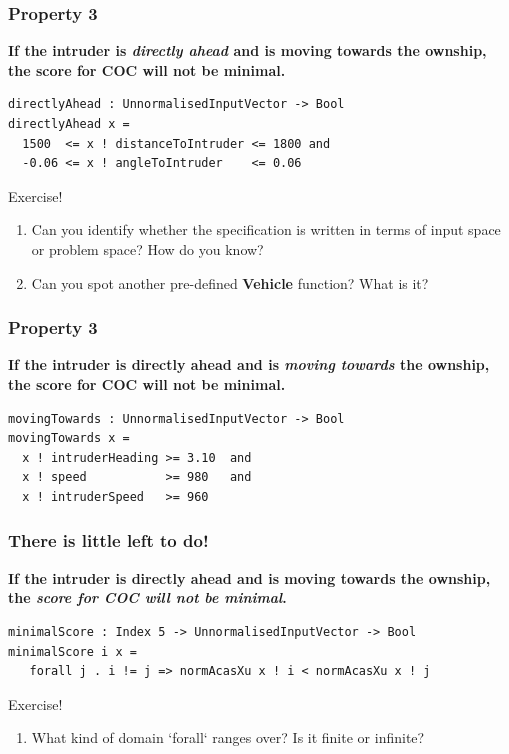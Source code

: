 \documentclass[t,compress,aspectratio=169]{beamer}
\begin{document}
\begin{frame}[fragile]
\frametitle{Property 3}


\footnotesize{\textbf{If the intruder is \emph{directly ahead} and is moving towards the
 ownship, the score for COC will not be minimal.}}

\pause

\begin{verbatim}
directlyAhead : UnnormalisedInputVector -> Bool
directlyAhead x =
  1500  <= x ! distanceToIntruder <= 1800 and
  -0.06 <= x ! angleToIntruder    <= 0.06
\end{verbatim}
\pause
\begin{block}{Exercise!}
\footnotesize{
\begin{enumerate}
\item
Can you identify whether the specification is written in terms of input space or problem space? How do you know?
\item Can you spot another pre-defined \textbf{Vehicle} function? What is it?
\end{enumerate}}
\end{block}

\end{frame}




\begin{frame}[fragile]
\frametitle{Property 3}

\footnotesize{\textbf{If the intruder is directly ahead and is \emph{moving towards} the
 ownship, the score for COC will not be minimal.}}

\pause

\begin{verbatim}
movingTowards : UnnormalisedInputVector -> Bool
movingTowards x =
  x ! intruderHeading >= 3.10  and
  x ! speed           >= 980   and
  x ! intruderSpeed   >= 960
\end{verbatim}


\end{frame}

\begin{frame}[fragile]
\frametitle{There is little left to do!}

\footnotesize{
\textbf{If the intruder is directly ahead and is moving towards the
 ownship, the \emph{score for COC will not be minimal}.}}

\pause

\begin{verbatim}
minimalScore : Index 5 -> UnnormalisedInputVector -> Bool
minimalScore i x = 
   forall j . i != j => normAcasXu x ! i < normAcasXu x ! j
\end{verbatim}
\pause
\begin{block}{Exercise!}
\footnotesize{
\begin{enumerate}
\item What kind of domain  `forall` ranges over? Is it finite or infinite?
\end{enumerate}}
\end{block}

\end{frame}
\end{document}
